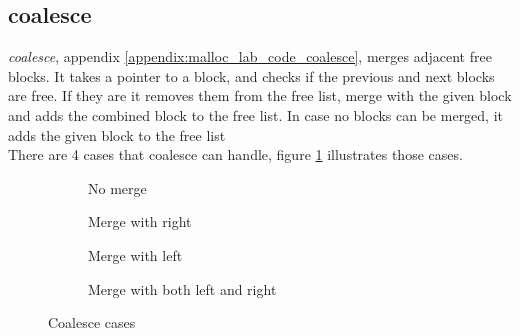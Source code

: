 \documentclass[11pt]{report}
\begin{document}
\subsection{coalesce}
\textit{coalesce}, appendix \ref{appendix:malloc_lab_code_coalesce}, merges adjacent free blocks. It takes a pointer to a block, and checks if the previous and next blocks are free. If they are it removes them from the free list, merge with the given block and adds the combined block to the free list. In case no blocks can be merged, it adds the given block to the free list\\[1ex]

There are 4 cases that coalesce can handle, figure \ref{fig:malloc_lab_coalesce} illustrates those cases.
\begin{figure}[h]
    \begin{subfigure}[b]{\textwidth}
        \centering
        \caption{No merge}
    \end{subfigure}
    \begin{subfigure}[b]{\textwidth}
        \centering
        \caption{Merge with right}
    \end{subfigure}
    \begin{subfigure}[b]{\textwidth}
        \centering
        \caption{Merge with left}
    \end{subfigure}
    \begin{subfigure}[b]{\textwidth}
        \centering
        \caption{Merge with both left and right}
    \end{subfigure}

    \centering
    \caption{Coalesce cases}
    \label{fig:malloc_lab_coalesce}
\end{figure}
\end{document}
